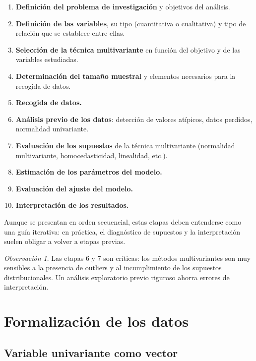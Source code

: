 \documentclass[12pt, a4paper]{article}
\theoremstyle{plain}
\theoremstyle{definition}
\theoremstyle{remark}
\newtheorem*{observacion}{Observación}
\begin{document}
\begin{enumerate}
  \item \textbf{Definición del problema de investigación} y objetivos del
        análisis.
  \item \textbf{Definición de las variables}, su tipo (cuantitativa o
        cualitativa) y tipo de relación que se establece entre ellas.
  \item \textbf{Selección de la técnica multivariante} en función del objetivo
        y de las variables estudiadas.
  \item \textbf{Determinación del tamaño muestral} y elementos necesarios para
        la recogida de datos.
  \item \textbf{Recogida de datos.}
  \item \textbf{Análisis previo de los datos}: detección de valores atípicos,
        datos perdidos, normalidad univariante.
  \item \textbf{Evaluación de los supuestos} de la técnica multivariante
        (normalidad multivariante, homocedasticidad, linealidad, etc.).
  \item \textbf{Estimación de los parámetros del modelo.}
  \item \textbf{Evaluación del ajuste del modelo.}
  \item \textbf{Interpretación de los resultados.}
\end{enumerate}

Aunque se presentan en orden secuencial, estas etapas deben entenderse como una
guía iterativa: en práctica, el diagnóstico de supuestos y la interpretación
suelen obligar a volver a etapas previas.

\begin{observacion}
Las etapas 6 y 7 son críticas: los métodos multivariantes son muy sensibles a
la presencia de outliers y al incumplimiento de los supuestos distribucionales.
Un análisis exploratorio previo riguroso ahorra errores de interpretación.
\end{observacion}

\section{Formalización de los datos}

\subsection{Variable univariante como vector}
\end{document}
